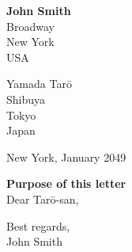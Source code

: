 \documentclass[a4paper,11.5pt,twoside]{article}
\begin{document}
\thispagestyle{empty}

\textbf{John Smith} \\
Broadway \\
New York \\
USA

\bigskip

Yamada Tarō \\
Shibuya \\
Tokyo \\
Japan \\

\bigskip

\hfill New York, January 2049\\

\bigskip

\textbf{Purpose of this letter}\\

Dear Tarō-san, \\

\lipsum[1-2] %

\bigskip

Best regards, \\

John Smith
\end{document}

